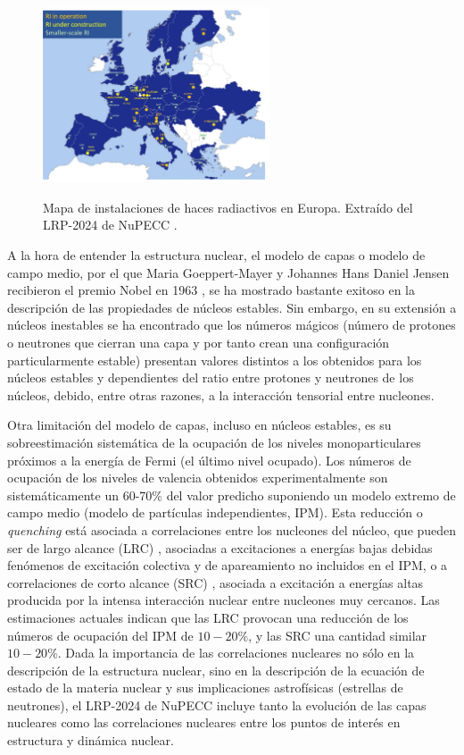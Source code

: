 \documentclass[a4paper,12pt,twoside]{article}
\begin{document}
\begin{figure}
\begin{center}
\includegraphics[width=0.6\textwidth]{EuRI.png}
\label{fig:euri}
\caption{Mapa de instalaciones de haces radiactivos en Europa. Extraído del LRP-2024 de NuPECC \cite{nupecc}.}
\end{center}
\end{figure}


A la hora de entender la estructura nuclear, el modelo de capas o modelo de campo medio, por el que Maria Goeppert-Mayer y Johannes Hans Daniel Jensen recibieron el premio Nobel en 1963 \cite{Goe49}, se ha mostrado bastante exitoso en la descripción de las propiedades de núcleos estables. Sin embargo, en su extensión a núcleos inestables se ha encontrado que los números mágicos (número de protones o neutrones que cierran una capa y por tanto crean una configuración particularmente estable) presentan valores distintos a los obtenidos para los núcleos estables y dependientes del ratio entre protones y neutrones de los núcleos, debido, entre otras razones, a la interacción tensorial entre nucleones\cite{Ots20}. 

Otra limitación del modelo de capas, incluso en núcleos estables, es su sobreestimación sistemática de la ocupación de los niveles monoparticulares próximos a la energía de Fermi (el último nivel ocupado). Los números de ocupación de los niveles de valencia obtenidos experimentalmente son sistemáticamente un 60-70\% \cite{Pan97} del valor predicho suponiendo un modelo extremo de campo medio (modelo de partículas independientes, IPM). Esta reducción o \textit{quenching} está asociada a correlaciones entre los nucleones del núcleo, que pueden ser de largo alcance (LRC) \cite{Bar09}, asociadas a excitaciones a energías bajas debidas fenómenos de excitación colectiva y de apareamiento no incluidos en el IPM, o a correlaciones de corto alcance (SRC) \cite{Sub08}, asociada a excitación a energías altas producida por la intensa interacción nuclear entre nucleones muy cercanos. Las estimaciones actuales indican que las LRC provocan una reducción de los números de ocupación del IPM de $10-20\%$, y las SRC una cantidad similar $10-20\%$. Dada la importancia de las correlaciones nucleares no sólo en la descripción de la estructura nuclear, sino en la descripción de la ecuación de estado de la materia nuclear y sus implicaciones astrofísicas (estrellas de neutrones), el LRP-2024 de NuPECC \cite{nupecc} incluye tanto la evolución de las capas nucleares como las correlaciones nucleares entre los puntos de interés en estructura y dinámica nuclear.
\end{document}
